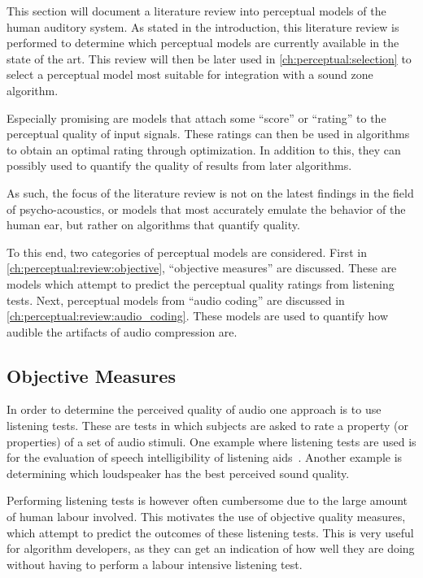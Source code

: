 This section will document a literature review into perceptual models of the human auditory system.
As stated in the introduction, this literature review is performed to determine which perceptual models are currently 
available in the state of the art.
This review will then be later used in \autoref{ch:perceptual:selection} to select a perceptual model most 
suitable for integration with a sound zone algorithm.

Especially promising are models that attach some ``score'' or ``rating'' to the perceptual quality of input signals.
These ratings can then be used in algorithms to obtain an optimal rating through optimization.
In addition to this, they can possibly used to quantify the quality of results from later algorithms.

As such, the focus of the literature review is not on the latest findings in the field of psycho-acoustics, or models 
that most accurately emulate the behavior of the human ear, but rather on algorithms that quantify quality.

To this end, two categories of perceptual models are considered.
First in \autoref{ch:perceptual:review:objective}, ``objective measures'' are discussed.
These are models which attempt to predict the perceptual quality ratings from listening tests. 
Next, perceptual models from ``audio coding'' are discussed in \autoref{ch:perceptual:review:audio_coding}.
These models are used to quantify how audible the artifacts of audio compression are.

\subsection{Objective Measures}
\label{ch:perceptual:review:objective}
In order to determine the perceived quality of audio one approach is to use listening tests.
These are tests in which subjects are asked to rate a property (or properties) of a set of audio stimuli.
One example where listening tests are used is for the evaluation of speech intelligibility of listening aids~\cite{taal2011algorithm}.
Another example is determining which loudspeaker has the best perceived sound quality.

Performing listening tests is however often cumbersome due to the large amount of human labour involved.
This motivates the use of objective quality measures, which attempt to predict the outcomes of these listening tests.
This is very useful for algorithm developers, as they can get an indication of how well they are doing
without having to perform a labour intensive listening test.

